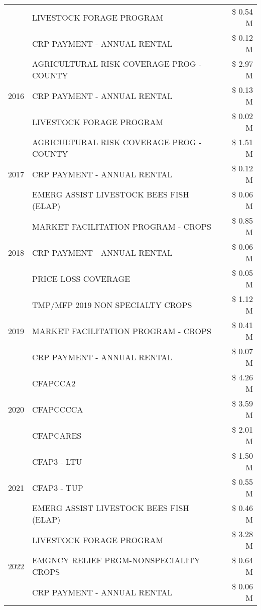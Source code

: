 \begin{tabular}{llr}
 & LIVESTOCK FORAGE PROGRAM & \$ 0.54 M \\
 & CRP PAYMENT - ANNUAL RENTAL & \$ 0.12 M \\
\cline{1-3}
\multirow[t]{3}{*}{2016} & AGRICULTURAL RISK COVERAGE PROG - COUNTY & \$ 2.97 M \\
 & CRP PAYMENT - ANNUAL RENTAL & \$ 0.13 M \\
 & LIVESTOCK FORAGE PROGRAM & \$ 0.02 M \\
\cline{1-3}
\multirow[t]{3}{*}{2017} & AGRICULTURAL RISK COVERAGE PROG - COUNTY & \$ 1.51 M \\
 & CRP PAYMENT - ANNUAL RENTAL & \$ 0.12 M \\
 & EMERG ASSIST LIVESTOCK BEES FISH (ELAP) & \$ 0.06 M \\
\cline{1-3}
\multirow[t]{3}{*}{2018} & MARKET FACILITATION PROGRAM - CROPS & \$ 0.85 M \\
 & CRP PAYMENT - ANNUAL RENTAL & \$ 0.06 M \\
 & PRICE LOSS COVERAGE & \$ 0.05 M \\
\cline{1-3}
\multirow[t]{3}{*}{2019} & TMP/MFP 2019 NON SPECIALTY CROPS & \$ 1.12 M \\
 & MARKET FACILITATION PROGRAM - CROPS & \$ 0.41 M \\
 & CRP PAYMENT - ANNUAL RENTAL & \$ 0.07 M \\
\cline{1-3}
\multirow[t]{3}{*}{2020} & CFAPCCA2 & \$ 4.26 M \\
 & CFAPCCCCA & \$ 3.59 M \\
 & CFAPCARES & \$ 2.01 M \\
\cline{1-3}
\multirow[t]{3}{*}{2021} & CFAP3 - LTU & \$ 1.50 M \\
 & CFAP3 - TUP & \$ 0.55 M \\
 & EMERG ASSIST LIVESTOCK BEES FISH (ELAP) & \$ 0.46 M \\
\cline{1-3}
\multirow[t]{3}{*}{2022} & LIVESTOCK FORAGE PROGRAM & \$ 3.28 M \\
 & EMGNCY RELIEF PRGM-NONSPECIALITY CROPS & \$ 0.64 M \\
 & CRP PAYMENT - ANNUAL RENTAL & \$ 0.06 M \\
\cline{1-3}
\bottomrule
\end{tabular}
